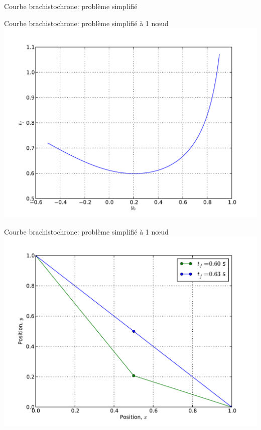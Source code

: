 \documentclass[8pt,a4paper]{beamer}
\begin{document}
\begin{frame}{Courbe brachistochrone: problème simplifié}

\end{frame}

\begin{frame}{Courbe brachistochrone: problème simplifié à 1 n\oe ud}
  \includegraphics[width = 1\textwidth]{figures/brachi1d.pdf}
\end{frame}

\begin{frame}{Courbe brachistochrone: problème simplifié à 1 n\oe ud}
  \includegraphics[width = 1\textwidth]{figures/brachi1d_sol.pdf}
\end{frame}
\end{document}

